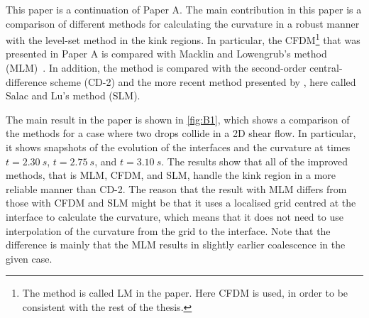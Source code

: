\documentclass[11pt,b5paper,DIV=calc,BCOR1.3cm,headings=small,%
               footinclude=false,headsepline]{scrbook}
\begin{document}
This paper is a continuation of Paper A.  The main contribution in this paper
is a comparison of different methods for calculating the curvature in a robust
manner with the level-set method in the kink regions.  In particular, the
CFDM\footnote{The method is called LM in the paper.  Here CFDM is used, in
  order to be consistent with the rest of the thesis.} that was presented in
Paper A is compared with Macklin and Lowengrub's method (MLM)~\cite{Macklin06}.
In addition, the method is compared with the second-order central-difference
scheme (CD-2) and the more recent method presented by \citet{Salac08}, here
called Salac and Lu's method (SLM).

The main result in the paper is shown in \cref{fig:B1}, which shows
a comparison of the methods for a case where two drops collide in a 2D shear
flow.  In particular, it shows snapshots of the evolution of the interfaces and
the curvature at times $t=\SI{2.30}{s}$, $t=\SI{2.75}{s}$, and
$t=\SI{3.10}{s}$.  The results show that all of the improved methods, that is
MLM, CFDM, and SLM, handle the kink region in a more reliable manner than CD-2.
The reason that the result with MLM differs from those with CFDM and SLM might
be that it uses a localised grid centred at the interface to calculate the
curvature, which means that it does not need to use interpolation of the
curvature from the grid to the interface.  Note that the difference is mainly
that the MLM results in slightly earlier coalescence in the given case.
\end{document}
